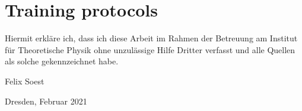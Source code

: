 \chapter{Training protocols}


\clearpage
\thispagestyle{empty}
\vspace*{1.5em}

Hiermit erkläre ich, dass ich diese Arbeit im Rahmen der Betreuung am Institut
für Theoretische Physik ohne unzulässige Hilfe Dritter verfasst und alle Quellen als solche gekennzeichnet habe.

\vspace*{45em}

Felix Soest \par
Dresden, Februar 2021


